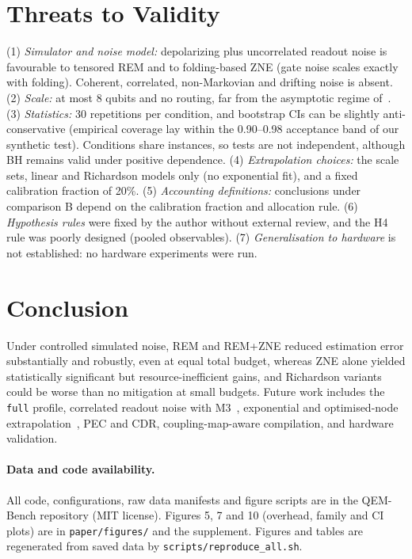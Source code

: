 \documentclass[11pt]{article}
\begin{document}
\section{Threats to Validity}
(1) \emph{Simulator and noise model:} depolarizing plus uncorrelated readout noise is favourable to tensored REM and to folding-based
ZNE (gate noise scales exactly with folding). Coherent, correlated, non-Markovian and drifting noise is absent. (2) \emph{Scale:} at most 8 qubits and
no routing, far from the asymptotic regime of~\cite{quek2024}. (3) \emph{Statistics:} 30 repetitions per condition, and
bootstrap CIs can be slightly anti-conservative (empirical coverage lay within the 0.90--0.98 acceptance band of our synthetic test). Conditions share instances, so tests are not
independent, although BH remains valid under positive dependence. (4) \emph{Extrapolation choices:} the scale sets, linear and Richardson
models only (no exponential fit), and a fixed calibration fraction of 20\%. (5) \emph{Accounting definitions:} conclusions under comparison B depend on
the calibration fraction and allocation rule. (6) \emph{Hypothesis rules} were fixed by the author without external review, and the H4 rule was poorly
designed (pooled observables). (7) \emph{Generalisation to hardware} is not established: no hardware experiments were run.

\section{Conclusion}
Under controlled simulated noise, REM and REM+ZNE reduced estimation error substantially and robustly, even at equal total budget,
whereas ZNE alone yielded statistically significant but resource-inefficient gains, and Richardson variants could be worse than no
mitigation at small budgets. Future work includes the \texttt{full} profile, correlated readout noise with M3~\cite{nation2021},
exponential and optimised-node extrapolation~\cite{krebsbach2022}, PEC and CDR, coupling-map-aware compilation, and hardware validation.

\paragraph{Data and code availability.} All code, configurations, raw data manifests and figure scripts are in the QEM-Bench repository
(MIT license). Figures 5, 7 and 10 (overhead, family and CI plots) are in \texttt{paper/figures/} and the supplement. Figures and tables are regenerated from saved data by \texttt{scripts/reproduce\_all.sh}.



\end{document}

